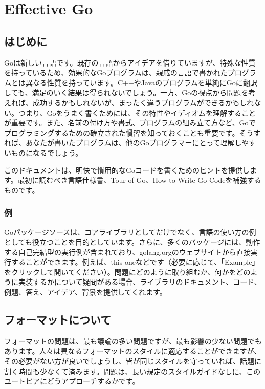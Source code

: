 \documentclass{jsarticle}
\begin{document}
\section{Effective Go}

\subsection{はじめに}

Goは新しい言語です。既存の言語からアイデアを借りていますが、特殊な性質を持っているため、効果的なGoプログラムは、親戚の言語で書かれたプログラムとは異なる性質を持っています。C++やJavaのプログラムを単純にGoに翻訳しても、満足のいく結果は得られないでしょう。一方、Goの視点から問題を考えれば、成功するかもしれないが、まったく違うプログラムができるかもしれない。つまり、Goをうまく書くためには、その特性やイディオムを理解することが重要です。また、名前の付け方や書式、プログラムの組み立て方など、Goでプログラミングするための確立された慣習を知っておくことも重要です。そうすれば、あなたが書いたプログラムは、他のGoプログラマーにとって理解しやすいものになるでしょう。

このドキュメントは、明快で慣用的なGoコードを書くためのヒントを提供します。最初に読むべき{言語仕様書}、{Tour
of Go}、{How to Write Go Code}を補強するものです。

\subsubsection{例}

{Goパッケージソース}は、コアライブラリとしてだけでなく、言語の使い方の例としても役立つことを目的としています。さらに、多くのパッケージには、動作する自己完結型の実行例が含まれており、{golang.org}のウェブサイトから直接実行することができます。例えば、{this
one}などです（必要に応じて、「Example」をクリックして開いてください）。問題にどのように取り組むか、何かをどのように実装するかについて疑問がある場合、ライブラリのドキュメント、コード、例題、答え、アイデア、背景を提供してくれます。

\subsection{フォーマットについて}

フォーマットの問題は、最も議論の多い問題ですが、最も影響の少ない問題でもあります。人々は異なるフォーマットのスタイルに適応することができますが、その必要がない方が良いでしょうし、皆が同じスタイルを守っていれば、話題に割く時間も少なくて済みます。問題は、長い規定のスタイルガイドなしに、このユートピアにどうアプローチするかです。
\end{document}

